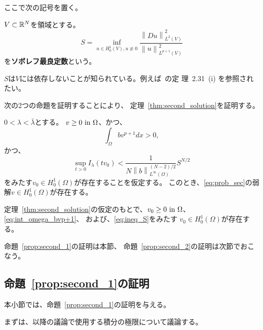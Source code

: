 ここで次の記号を置く。

\begin{defn} \label{defn:S_def}
 $V \subset \mathbb{R}^N$を領域とする。
 \begin{equation}
  S = \inf_{u \in H^1_0(V), u \not \equiv 0}
 \frac{\left\| Du \right\|_{L^2(V)}^2}{\left\| u
                                       \right\|_{L^{p+1}(V)}^2}  
 \label{eq:S_def}
 \end{equation}
 を{\bf ソボレフ最良定数}という。
\end{defn}

$S$は$V$には依存しないことが知られている。例えば~\cite{田中200808}の定
理~2.31~(i) を参照されたい。

次の2つの命題を証明することにより、
定理~\ref{thm:second_solution}を証明する。

\begin{prop} \label{prop:second_1}
 $0 < \lambda < \bar{\lambda}$とする。
 $v \geq 0 ~\text{in}~ \Omega$、かつ、
 \begin{equation}
  \int_\Omega b v^{p+1} dx > 0, \label{eq:int_omega_bvp+1}  
 \end{equation}
 かつ、
 \begin{equation}
  \sup_{t > 0} I_\lambda (tv_0) < 
   \frac{1}{N\left\| b
             \right\|_{L^\infty(\Omega)} ^{(N-2)/2}} S^{N/2} 
   \label{eq:ineq_S}
 \end{equation}
 をみたす$v_0 \in H_0^1(\Omega)$が存在することを仮定する。
 このとき、\ref{eq:prob_sec}の弱解$v \in H_0^1(\Omega)$が存在する。
\end{prop}

\begin{prop} \label{prop:second_2}
 定理~\ref{thm:second_solution}の仮定のもとで、$v_0 \geq 0 ~\text{in}~
 \Omega$、\eqref{eq:int_omega_bvp+1}、
 および、\eqref{eq:ineq_S}をみたす
 $v_0 \in H_0^1(\Omega)$が存在する。
\end{prop}

命題~\ref{prop:second_1}の証明は本節、
命題~\ref{prop:second_2}の証明は次節でおこなう。

\subsection{命題~\ref{prop:second_1}の証明}

本小節では、命題~\ref{prop:second_1}の証明を与える。

まずは、以降の議論で使用する積分の極限について議論する。

